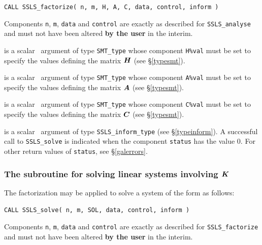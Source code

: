 \documentclass{galahad}
\newcommand{\packagename}{SSLS}
\begin{document}
\hspace{8mm}
{\tt CALL \packagename\_factorize( n, m, H, A, C, data, control, inform )}

\noindent
Components {\tt n}, {\tt m}, {\tt data} and {\tt control} 
are exactly as described for
{\tt \packagename\_analyse} and must not have been altered {\bf by the user}
in the interim.

\begin{description}
 is a scalar \intentin\ argument of type {\tt SMT\_type} whose
component {\tt H\%val} must be set to specify the values defining the 
matrix ${\bm{H}}$ (see \S\ref{typesmt}).

 is a scalar \intentin\ argument of type {\tt SMT\_type} whose
component {\tt A\%val} must be set to specify the values defining the 
matrix ${\bm{A}}$ (see \S\ref{typesmt}).

 is a scalar \intentin\ argument of type {\tt SMT\_type} whose
component {\tt C\%val} must be set to specify the values defining the 
matrix ${\bm{C}}$ (see \S\ref{typesmt}).

 is a scalar \intentout\ argument of type
{\tt \packagename\_inform\_type}
(see \S\ref{typeinform}). A successful call to
{\tt \packagename\_solve}
is indicated when the  component {\tt status} has the value 0.
For other return values of {\tt status}, see \S\ref{galerrors}.

\end{description}


\subsubsection{The subroutine for solving linear systems involving ${\bm{K}}$}
The factorization may be applied to solve a system of the
form  as follows:
\vspace*{1mm}

\hspace{8mm}
{\tt CALL \packagename\_solve( n, m, SOL, data, control, inform )}
\vspace*{1mm}

\noindent
Components {\tt n}, {\tt m}, {\tt data} and {\tt control} 
are exactly as described for
{\tt \packagename\_factorize} and must not have been altered {\bf by the user}
in the interim.
\end{document}
